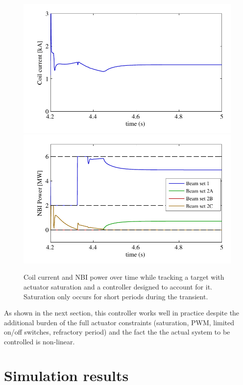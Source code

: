 \documentclass[12pt,lot, lof]{puthesis}
\begin{document}
\begin{figure}[htbp]
	\centering
	\includegraphics{chap10/good_u_sat_current}
	\includegraphics{chap10/good_u_sat_beams}
	\caption{Coil current and NBI power over time while tracking a target with actuator saturation and a controller designed to account for it.
		Saturation only occurs for short periods during the transient.}
	\label{fig:good_u_sat}
\end{figure}

As shown in the next section, this controller works well in practice despite the additional burden of the full actuator constraints (saturation, PWM, limited on/off switches, refractory period) and the fact the the actual system to be controlled is non-linear.

\section{Simulation results} 

\label{results}
\end{document}
